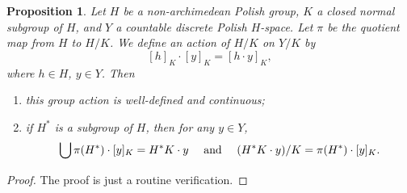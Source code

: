 \documentclass[11pt]{amsart}
\newtheorem{proposition}[theorem]{Proposition}
\theoremstyle{definition}
\theoremstyle{remark}
\numberwithin{equation}{section}
\def\itx#1{{\mbox{\textrm{ #1 }}}}
\begin{document}
\begin{proposition}\label{induced action of quotient group}
    Let $H$ be a non-archimedean Polish group, $K$ a closed normal subgroup of $H$, and $Y$ a countable discrete Polish $H$-space. Let $\pi$ be the quotient map from $H$ to $H/K$. We define an action of $H/K$ on $Y/K$ by
    $$[h]_K\cdot[y]_K=[h\cdot y]_K,$$
    where $h\in H$, $y\in Y$. Then
    \begin{enumerate}
        \item this group action is well-defined and continuous;
        \item if $H^*$ is a subgroup of $H$, then for any $y \in Y$,
        \begin{align*}
            \bigcup\pi(H^*)\cdot[y]_K=H^*K\cdot y&&\itx{and}&&(H^*K\cdot y)/K=\pi(H^*)\cdot[y]_K.
        \end{align*}
    \end{enumerate}
\end{proposition}
\begin{proof}
    The proof is just a routine verification.
\end{proof}


\end{document}
